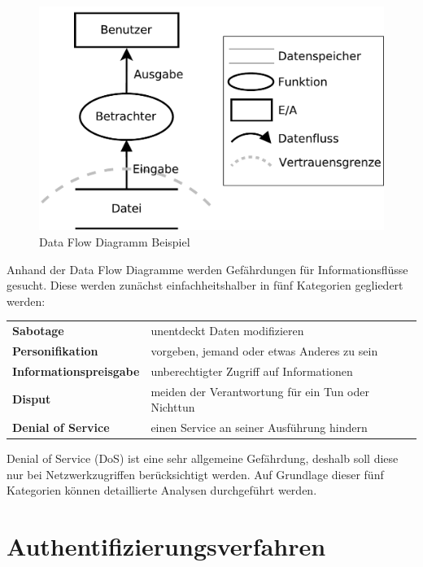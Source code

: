 \documentclass[11pt,a4paper]{report}
\begin{document}
\begin{figure}[htbp]
\centering
\includegraphics[scale=0.4]{images/dfd_intro.pdf}
\caption{Data Flow Diagramm Beispiel}
\label{fig:dfd_intro}
\end{figure}

Anhand der Data Flow Diagramme werden Gefährdungen für Informationsflüsse gesucht. Diese werden zunächst einfachheitshalber in fünf Kategorien gegliedert werden:

\begin{table}[h] %
\begin{tabularx}{\linewidth}{@{}lX@{}}
\textbf{Sabotage} & unentdeckt Daten modifizieren\\
\textbf{Personifikation} & vorgeben, jemand oder etwas Anderes zu sein\\
\textbf{Informationspreisgabe} & unberechtigter Zugriff auf Informationen\\
\textbf{Disput} & meiden der Verantwortung für ein Tun oder Nichttun\\
\textbf{Denial of Service} & einen Service an seiner Ausführung hindern\\
\end{tabularx}
\end{table}

Denial of Service (DoS) ist eine sehr allgemeine Gefährdung, deshalb soll diese nur bei Netzwerkzugriffen berücksichtigt werden. Auf Grundlage dieser fünf Kategorien können detaillierte Analysen durchgeführt werden.

\section{Authentifizierungsverfahren} \label{sec:auth_modells}
\end{document}

